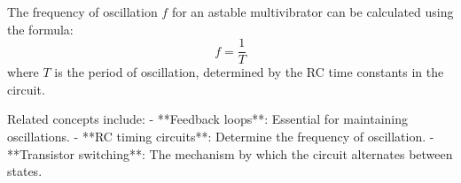 The frequency of oscillation \( f \) for an astable multivibrator can be calculated using the formula:
\[
f = \frac{1}{T}
\]
where \( T \) is the period of oscillation, determined by the RC time constants in the circuit.

Related concepts include:
- **Feedback loops**: Essential for maintaining oscillations.
- **RC timing circuits**: Determine the frequency of oscillation.
- **Transistor switching**: The mechanism by which the circuit alternates between states.

